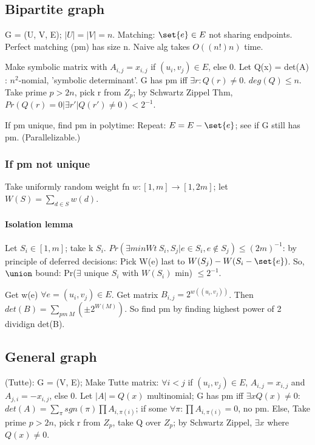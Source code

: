 \documentclass[oneside, article]{memoir}
\begin{document}
\subsection{Bipartite graph}
G = (U, V, E); $|U| = |V| = n$. Matching: $\set{e} \in E$ not sharing endpoints. Perfect matching (pm) has size n. Naive alg takes $O((n!)n)$ time.

Make symbolic matrix with $A_{i,j} = x_{i,j}$ if $(u_{i}, v_{j})\in E$, else 0. Let Q(x) = det(A) : $n^{2}$-nomial, 'symbolic determinant'. G has pm iff $\exists r: Q(r) \neq 0$. $deg(Q) \leq n$. Take prime $p > 2n$, pick r from $Z_{p}$; by Schwartz Zippel Thm, $Pr(Q(r) = 0 | \exists r'|Q(r') \neq 0) < 2^{-1}$.

If pm unique, find pm in polytime: Repeat: $E = E - \set{e}$; see if G still has pm. (Parallelizable.)

\subsubsection{If pm not unique}
Take uniformly random weight fn $w:[1,m] \to [1,2m]$; let $W(S) = \sum_{d \in S} w(d)$.

\paragraph*{Isolation lemma}
Let $S_{i} \in [1,m]$; take k $S_{i}$. $Pr(\exists minWt\ S_{i}, S_{j} | e \in S_{i} , e \notin S_{j}) \leq (2m)^{-1}$: by principle of deferred decisions: Pick W(e) last to $W(S_{j}) - W(S_{i} - \set{e})$. So, $\union$ bound: Pr($\exists$ unique $S_{i}$ with $W(S_{i})$ min) $\leq 2^{-1}$.

Get w(e) $\forall e = (u_{i}, v_{j}) \in E$. Get matrix $B_{i,j} = 2^{w((u_{i}, v_{j}))}$. Then $det(B) = \sum_{pm\ M} (\pm 2^{W(M)})$. So find pm by finding highest power of 2 dividign det(B).

\subsection{General graph}
(Tutte): G = (V, E); Make Tutte matrix: $\forall i<j$ if $(u_{i}, v_{j})\in E$, $A_{i,j} = x_{i,j}$ and $A_{j,i} = -x_{i,j}$, else 0. Let $|A| = Q(x)$ multinomial; G has pm iff $\exists x Q(x) \neq 0$: $det(A) = \sum_{\pi} sgn(\pi) \prod A_{i, \pi(i)}$; if some $\forall \pi: \prod A_{i, \pi(i)} = 0 $, no pm. Else, Take prime $p > 2n$, pick r from $Z_{p}$, take Q over $Z_{p}$; by Schwartz Zippel, $\exists x$ where $Q(x) \neq 0$.
\end{document}
